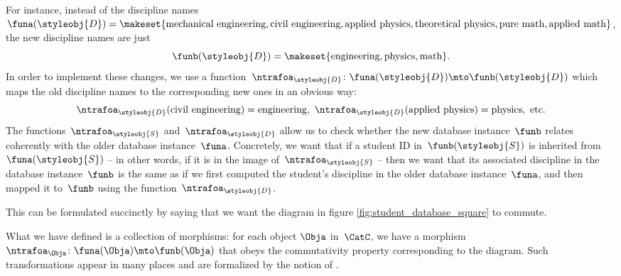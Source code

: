 For instance, instead of the discipline names~$\funa(\styleobj{D}) = \makeset{ \text{mechanical engineering}, \text{civil}\ \text{engineering}, \text{applied}\ \text{physics}, \text{theoretical}\ \text{physics}, \text{pure}\ \text{math}, \linebreak[1]\text{applied}\ \text{math} }$, the new discipline names are just
%
\begin{equation}
    \funb(\styleobj{D}) = \makeset{ \text{engineering}, \text{physics}, \text{math} }.
\end{equation}
%
In order to implement these changes, we use a function~$\ntrafoa_{\styleobj{D}}\colon \funa(\styleobj{D}) \mto \funb(\styleobj{D})$ which maps the old discipline names to the corresponding new ones in an obvious way:
\begin{equation}
    \ntrafoa_{\styleobj{D}}(\text{civil engineering}) = \text{engineering}, \ \ntrafoa_{\styleobj{D}}(\text{applied physics}) = \text{physics}, \ \text{etc.}
\end{equation}
The functions~$\ntrafoa_\styleobj{S}$ and~$\ntrafoa_\styleobj{D}$ allow us to check whether the new database instance~$\funb$ relates coherently with the older database instance~$\funa$.
Concretely, we want that if a student ID in~$\funb(\styleobj{S})$ is inherited from~$\funa(\styleobj{S})$ -- in other words, if it is in the image of~$\ntrafoa_{\styleobj{S}}$ -- then we want that its associated discipline in the database instance~$\funb$ is the same as if we first computed the student's discipline in the older database instance~$\funa$, and then mapped it to~$\funb$ using the function~$\ntrafoa_{\styleobj{D}}$.

%
\begin{marginfigure}
    \centering
    \caption{}
    \label{fig:student_database_square}
\end{marginfigure}
%

This can be formulated succinctly by saying that we want the diagram in figure \cref{fig:student_database_square} to commute.

What we have defined is a collection of morphisms: for each object $\Obja$ in~$\CatC$, we have a morphism~$\ntrafoa_\Obja \colon \funa(\Obja) \mto \funb(\Obja)$ that obeys the commutativity property corresponding to the diagram.
Such transformations appear in many places and are formalized by the notion of .

